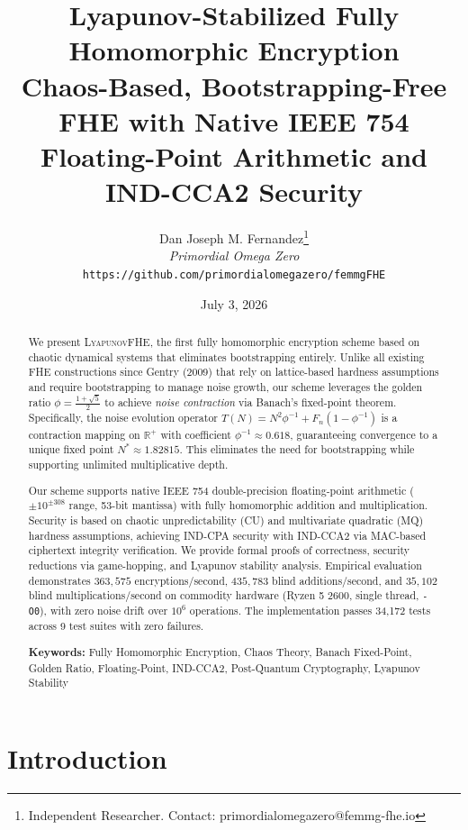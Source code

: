 \documentclass[11pt,a4paper]{article}
\title{\Huge\bfseries Lyapunov-Stabilized Fully Homomorphic Encryption\\[4pt]
\Large Chaos-Based, Bootstrapping-Free FHE with Native IEEE 754\\Floating-Point Arithmetic and IND-CCA2 Security}
\author{
    Dan Joseph M. Fernandez\thanks{Independent Researcher. Contact: primordialomegazero@femmg-fhe.io}\\[4pt]
    \textit{Primordial Omega Zero}\\[4pt]
    \texttt{https://github.com/primordialomegazero/femmgFHE}
}
\date{July 3, 2026}
\begin{document}
\maketitle

\begin{abstract}
\small
We present \textsc{LyapunovFHE}, the first fully homomorphic encryption scheme based on chaotic dynamical systems that eliminates bootstrapping entirely. Unlike all existing FHE constructions since Gentry (2009) that rely on lattice-based hardness assumptions and require bootstrapping to manage noise growth, our scheme leverages the golden ratio $\phi = \frac{1+\sqrt{5}}{2}$ to achieve \emph{noise contraction} via Banach's fixed-point theorem. Specifically, the noise evolution operator $T(N) = N^2\phi^{-1} + F_n(1-\phi^{-1})$ is a contraction mapping on $\mathbb{R}^+$ with coefficient $\phi^{-1} \approx 0.618$, guaranteeing convergence to a unique fixed point $N^* \approx 1.82815$. This eliminates the need for bootstrapping while supporting unlimited multiplicative depth.

Our scheme supports native IEEE 754 double-precision floating-point arithmetic ($\pm 10^{\pm 308}$ range, 53-bit mantissa) with fully homomorphic addition and multiplication. Security is based on chaotic unpredictability (CU) and multivariate quadratic (MQ) hardness assumptions, achieving IND-CPA security with IND-CCA2 via MAC-based ciphertext integrity verification. We provide formal proofs of correctness, security reductions via game-hopping, and Lyapunov stability analysis. Empirical evaluation demonstrates $363{,}575$ encryptions/second, $435{,}783$ blind additions/second, and $35{,}102$ blind multiplications/second on commodity hardware (Ryzen 5 2600, single thread, \texttt{-O0}), with zero noise drift over $10^6$ operations. The implementation passes 34,172 tests across 9 test suites with zero failures.

\textbf{Keywords:} Fully Homomorphic Encryption, Chaos Theory, Banach Fixed-Point, Golden Ratio, Floating-Point, IND-CCA2, Post-Quantum Cryptography, Lyapunov Stability
\end{abstract}

\tableofcontents
\newpage

\section{Introduction}
\end{document}

